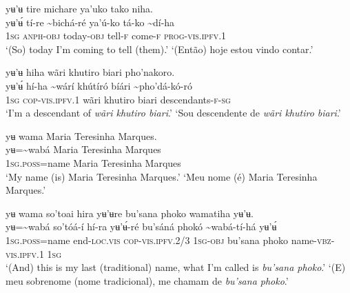 \documentclass[output=paper,
modfonts,nonflat
]{langsci/langscibook}
\begin{document}
 
\ea yʉ’ʉ tire michare ya'uko tako niha.\\[.3em]
\gll yʉ'ʉ́	tí-re	{\textasciitilde}bichá-ré	ya'ú-ko  	tá-ko	{\textasciitilde}dí-ha\\
     1\textsc{sg}	\textsc{anph-obj}  	today\textsc{-obj}  	tell-\textsc{f} 	come-\textsc{f}	\textsc{prog-vis.ipfv.}1\\
\glt ‘(So) today I'm coming to tell (them).’{\footnotemark}
\glt ‘(Então) hoje estou vindo contar.’
\z

\ea yʉ’ʉ hiha wãri khutiro biari pho'nakoro. \\[.3em]
\gll yʉ'ʉ́	hí-ha	{\textasciitilde}wárí khútíró bíári	{\textasciitilde}pho'dá-kó-ró \\
     1\textsc{sg}	\textsc{cop-vis.ipfv.}1	wãri khutiro biari	descendants{\footnotemark}\textsc{-f-sg}\\
\glt ‘I'm a descendant of \textit{wãri khutiro biari}.’
\glt ‘Sou descendente de \textit{wãri khutiro biari}.’
\z 

\newpage
\ea yʉ wama Maria Teresinha Marques. \\[.3em]
\gll yʉ={\textasciitilde}wabá	Maria Teresinha Marques \\
     1\textsc{sg.poss}=name	Maria Teresinha Marques\\
\glt ‘My name (is) Maria Teresinha Marques.’
\glt ‘Meu nome (é) Maria Teresinha Marques.’
\z 

\ea yʉ wama so'toai hira yʉ’ʉre bu'sana phoko wamatiha yʉ’ʉ. \\[.3em]
\gll yʉ={\textasciitilde}wabá	so'tóá-í	hí-ra	yʉ’ʉ́-ré	bu'sáná phokó	{\textasciitilde}wabá-tí-há	yʉ’ʉ́ \\
     1\textsc{sg.poss}=name	end-\textsc{loc.vis}	\textsc{cop-vis.ipfv.}2/3	1\textsc{sg-obj}  	bu'sana phoko	name\textsc{-vbz-vis.ipfv.}1	1\textsc{sg} \\
\glt ‘(And){\footnotemark} this is my last (traditional) name, what I'm called is \textit{bu'sana phoko}.’
\glt ‘(E) meu sobrenome (nome tradicional), me chamam de \textit{bu'sana phoko}.’
\z 
\end{document}
